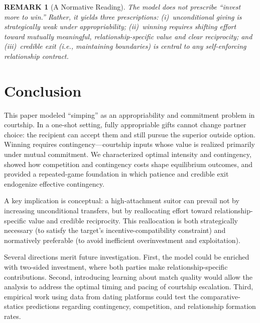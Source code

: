 \documentclass[AER]{AEA}
\newtheorem{remark}{REMARK}
\begin{document}
\begin{remark}[A Normative Reading]
The model does \emph{not} prescribe ``invest more to win.''
Rather, it yields three prescriptions:
(i)~unconditional giving is strategically weak under appropriability;
(ii)~winning requires shifting effort toward mutually meaningful, relationship-specific value and clear reciprocity; and
(iii)~credible exit (i.e., maintaining boundaries) is central to any self-enforcing relationship contract.
\end{remark}

\section{Conclusion}

This paper modeled ``simping'' as an appropriability and commitment problem in courtship.
In a one-shot setting, fully appropriable gifts cannot change partner choice: the recipient can accept them and still pursue the superior outside option.
Winning requires contingency---courtship inputs whose value is realized primarily under mutual commitment.
We characterized optimal intensity and contingency, showed how competition and contingency costs shape equilibrium outcomes, and provided a repeated-game foundation in which patience and credible exit endogenize effective contingency.

A key implication is conceptual: a high-attachment suitor can prevail not by increasing unconditional transfers, but by reallocating effort toward relationship-specific value and credible reciprocity.
This reallocation is both strategically necessary (to satisfy the target's incentive-compatibility constraint) and normatively preferable (to avoid inefficient overinvestment and exploitation).

Several directions merit future investigation.
First, the model could be enriched with two-sided investment, where both parties make relationship-specific contributions.
Second, introducing learning about match quality would allow the analysis to address the optimal timing and pacing of courtship escalation.
Third, empirical work using data from dating platforms could test the comparative-statics predictions regarding contingency, competition, and relationship formation rates.

\FloatBarrier

\end{document}
